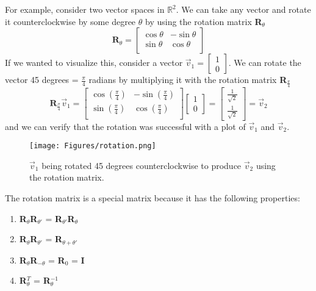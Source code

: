 \documentclass{article}
\begin{document}
For example, consider two vector spaces in $\mathbb{R}^2$.
We can take any vector and rotate it counterclockwise by some degree $\theta$ by using the rotation matrix \textbf{R}$_{\theta}$
\begin{equation}
  \textbf{R}_{\theta} =
  \begin{bmatrix}
    \cos{\theta} & -\sin{\theta}\\
    \sin{\theta} & \cos{\theta} \\
  \end{bmatrix}
\end{equation}
If we wanted to visualize this, consider a vector $\vec{v}_1 = \begin{bmatrix} 1 \\ 0 \end{bmatrix}$.
We can rotate the vector 45 degrees = $\frac{\pi}{4}$ radians by multiplying it with the rotation matrix \textbf{R}$_\frac{\pi}{4}$
\begin{equation}
  \textbf{R}_\frac{\pi}{4} \vec{v}_1 =
  \begin{bmatrix}
    \cos{( \frac{\pi}{4} )} & -\sin{( \frac{\pi}{4} )}\\[6pt]
    \sin{( \frac{\pi}{4} )} & \cos{( \frac{\pi}{4} )} \\
  \end{bmatrix}
  \begin{bmatrix}
    1 \\ 0
  \end{bmatrix}
  =
  \begin{bmatrix}
    \frac{1}{\sqrt{2}} \\[6pt] \frac{1}{\sqrt{2}}
  \end{bmatrix}
  = \vec{v}_2
\end{equation}
and we can verify that the rotation was successful with a plot of $\vec{v}_1$ and $\vec{v}_2$.
\begin{figure}[H]
  \centering
  \texttt{[image: Figures/rotation.png]}
    \caption{$\vec{v}_1$ being rotated 45 degrees counterclockwise to produce $\vec{v}_2$ using the rotation matrix.}
  \label{fig:rotation}
\end{figure}
The rotation matrix is a special matrix because it has the following properties:
\begin{enumerate}
  \item \textbf{R}$_{\theta}$\textbf{R}$_{\theta'}$ = \textbf{R}$_{\theta'}$\textbf{R}$_{\theta}$
  \item \textbf{R}$_{\theta}$\textbf{R}$_{\theta'}$ = \textbf{R}$_{\theta + \theta'}$
  \item \textbf{R}$_{\theta}$\textbf{R}$_{-\theta}$ = \textbf{R}$_{0}$ = \textbf{I}
  \item \textbf{R}$_{\theta}^T$ = \textbf{R}$_{\theta}^{-1}$
\end{enumerate}
\end{document}
